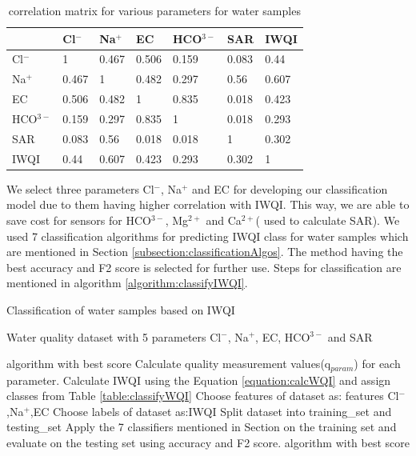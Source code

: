 \begin{table}[h!]
    \centering
    \begin{tabular}{|l|l|l|l|l|l|l|}
    \hline
         & Cl$^-$ & Na$^+$ & EC & HCO$^{3-}$ & SAR & IWQI \\ \hline
        Cl$^-$ & 1 & 0.467 & 0.506 & 0.159 & 0.083 & 0.44 \\ \hline
        Na$^+$ & 0.467 & 1 & 0.482 & 0.297 & 0.56 & 0.607 \\ \hline
        EC & 0.506 & 0.482 & 1 & 0.835 & 0.018 & 0.423 \\ \hline
        HCO$^{3-}$ & 0.159 & 0.297 & 0.835 & 1 & 0.018 & 0.293 \\ \hline
        SAR & 0.083 & 0.56 & 0.018 & 0.018 & 1 & 0.302 \\ \hline
        IWQI & 0.44 & 0.607 & 0.423 & 0.293 & 0.302 & 1 \\ \hline
    \end{tabular}
    \caption{correlation matrix for various parameters for water samples}
    \label{table:correlationMatrixOfIons&IWQI}
\end{table}

We select three parameters Cl$^-$, Na$^+$ and EC for developing our classification model due to them having higher correlation with IWQI. This way, we are able to save cost for sensors for HCO$^{3-}$, Mg$^{2+}$ and Ca$^{2+}$( used to calculate SAR). We used 7 classification algorithms for predicting IWQI class for water samples which are mentioned in Section \ref{subsection:classificationAlgos}. The method having the best accuracy and F2 score is selected for further use. Steps for classification are mentioned in algorithm \ref{algorithm:classifyIWQI}.

\begin{algorithm}[H]
	\caption{Classification of water samples based on IWQI}
	\begin{algorithmic}[1]
	    \label{algorithm:classifyIWQI}
		\renewcommand{\algorithmicrequire}{\textbf{Input:}}
		\renewcommand{\algorithmicensure}{\textbf{Output:}}
		\REQUIRE Water quality dataset with 5 parameters Cl$^-$, Na$^+$, EC, HCO$^{3-}$ and SAR
		
		\ENSURE  algorithm with best score       
        \STATE Calculate quality measurement values(q$_{param}$) for each parameter.
        \STATE Calculate IWQI using the Equation \ref{equation:calcWQI} and assign classes from Table \ref{table:classifyWQI}
        \STATE Choose features of dataset as: features \xleftarrow{} Cl$^-$,Na$^+$,EC 
        \STATE Choose labels of dataset as:IWQI
        \STATE Split dataset into training\_set and testing\_set
        \STATE Apply the 7 classifiers mentioned in Section \text{\ref{subsection:classificationAlgos}} on the training set and evaluate on the testing set using accuracy and F2 score.
        \RETURN algorithm with best score
	\end{algorithmic} 
\end{algorithm}

